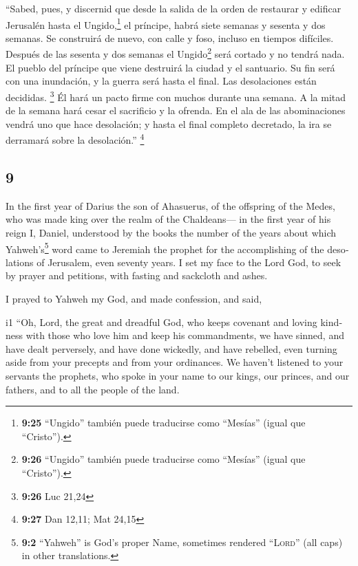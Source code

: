 \begin{paracol}{2}
 ``Sabed, pues, y discernid que desde la salida de la
orden de restaurar y edificar Jerusalén hasta el Ungido,\footnote{\textbf{9:25}
  ``Ungido'' también puede traducirse como ``Mesías'' (igual que
  ``Cristo'').} el príncipe, habrá siete semanas y sesenta y dos
semanas. Se construirá de nuevo, con calle y foso, incluso en tiempos
difíciles.  Después de las sesenta y dos semanas el
Ungido\footnote{\textbf{9:26} ``Ungido'' también puede traducirse como
  ``Mesías'' (igual que ``Cristo'').} será cortado y no tendrá nada. El
pueblo del príncipe que viene destruirá la ciudad y el santuario. Su fin
será con una inundación, y la guerra será hasta el final. Las
desolaciones están decididas. \footnote{\textbf{9:26} Luc 21,24}
 Él hará un pacto firme con muchos durante una semana. A
la mitad de la semana hará cesar el sacrificio y la ofrenda. En el ala
de las abominaciones vendrá uno que hace desolación; y hasta el final
completo decretado, la ira se derramará sobre la desolación.''
\footnote{\textbf{9:27} Dan 12,11; Mat 24,15}

\switchcolumn
\begin{otherlanguage}{english}

\hypertarget{section-17}{%
\section{9}\label{section-17}}

 In the first year of Darius the son of Ahasuerus, of the
offspring of the Medes, who was made king over the realm of the
Chaldeans---  in the first year of his reign I, Daniel,
understood by the books the number of the years about which
Yahweh's\footnote{\textbf{9:2} ``Yahweh'' is God's proper Name,
  sometimes rendered ``\textsc{Lord}'' (all caps) in other translations.}
word came to Jeremiah the prophet for the accomplishing of the
desolations of Jerusalem, even seventy years.  I set my
face to the Lord God, to seek by prayer and petitions, with fasting and
sackcloth and ashes.

 I prayed to Yahweh my God, and made confession, and said,

i1 ``Oh, Lord, the great and dreadful God, who keeps covenant and loving
kindness with those who love him and keep his commandments,
 we have sinned, and have dealt perversely, and have done
wickedly, and have rebelled, even turning aside from your precepts and
from your ordinances.  We haven't listened to your
servants the prophets, who spoke in your name to our kings, our princes,
and our fathers, and to all the people of the land.


\end{otherlanguage}
\end{paracol}
